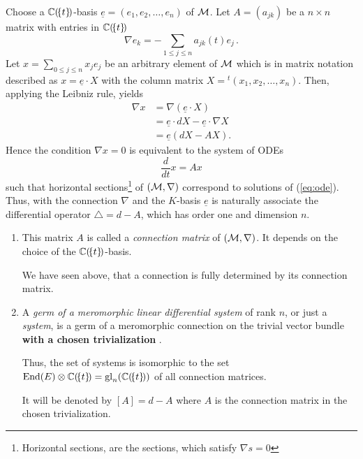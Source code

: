 Choose a $\mathbb{C}(\!\{t\}\!)$-basis $\underline{e}=(e_1,e_2,\dots,e_n)$ of $\mathcal{M}$.
Let $A=(a_{jk})$ be a $n\times n$ matrix with entries in $\mathbb{C}(\!\{t\}\!)$
\[
  \nabla e_k
  =
  -\sum_{1\leq j\leq n} a_{jk}(t)e_j \,.
\]
Let $x=\sum_{0\leq j\leq n}x_je_j$ be an arbitrary element of $\mathcal{M}$ which is in
matrix notation described as $x=\underline{e}\cdot X$ with the column matrix
$X={}^t\!(x_1,x_2 ,\dots,x_n)$.
Then, applying the Leibniz rule, yields
\begin{align*}
  \nabla x&=\nabla\left(\underline{e}\cdot X\right)
  \\&=\underline{e} \cdot dX - \underline{e}\cdot \nabla X
  \\&=\underline{e}\left(dX-AX\right).
\end{align*}
Hence the condition $\nabla x=0$ is equivalent to the system of ODEs
\begin{equation}\label{eq:ode}
  \frac{d}{dt}x=Ax
\end{equation}
such that horizontal sections\footnote{Horizontal sections, are the sections,
which satisfy $\nabla s=0$} of $(\mathcal{M},\nabla)$ correspond to solutions of
(\ref{eq:ode}).
Thus, with the connection $\nabla$ and the $K$-basis $\underline{e}$ is
naturally associate the differential operator $\triangle=d-A$, which has order
one and dimension $n$.

\begin{comment}
  This means that the connection $\nabla$ is fully determined by the matrix $A$
  and thus is fully determined by $A'$.
\end{comment}
\begin{defn}
  \begin{enumerate}
    \item This matrix $A$ is called a \emph{connection matrix} of
      $(\mathcal{M},\nabla)$. It depends on the choice of the $\mathbb{C}(\!\{t\}\!)$-basis.
      \begin{s-rem}
        We have seen above, that a connection is fully determined by its
        connection matrix.
      \end{s-rem}
    \item A \emph{germ of a meromorphic linear differential system} of rank
      $n$, or just a \emph{system}, is a germ of a meromorphic connection on
      the trivial vector bundle \textbf{with a chosen trivialization}
      .
      \begin{s-prop}
        Thus, the set of systems is isomorphic to the set
        $\operatorname{End}(E)\otimes\mathbb{C}(\!\{t\}\!)=\operatorname{gl}_n(\mathbb{C}(\!\{t\}\!))$ of all
        connection matrices.
      \end{s-prop}
      It will be denoted by $[A]=d-A$ where $A$ is the connection matrix in the
      chosen trivialization.
  \end{enumerate}
\end{defn}

